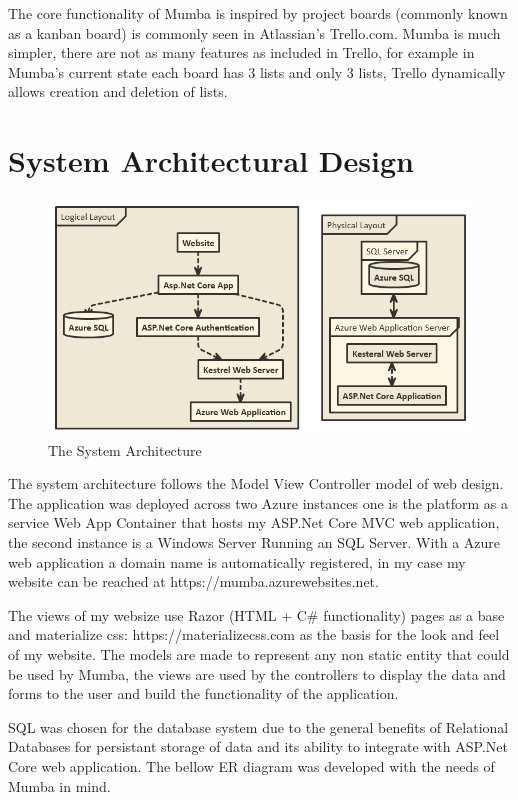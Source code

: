 \documentclass[letterpaper]{article}
\begin{document}
The core functionality of Mumba is inspired by project boards (commonly known as  a kanban board) is commonly seen in Atlassian's Trello.com. Mumba is much simpler, there are not as many features as included in Trello, for example in Mumba's current state each board has 3 lists and only 3 lists, Trello dynamically allows creation and deletion of lists.

\section{System Architectural Design}
\begin{figure}[H]
  \centering
  \caption{The System Architecture}
  \includegraphics[scale=0.45]{Images/System}
\end{figure}
The system architecture follows the Model View Controller model of web design. The application was deployed across two Azure instances one is the platform as a service Web App Container that hosts my ASP.Net Core MVC web application, the second instance is a Windows Server Running an SQL Server. With a Azure web application a domain name is automatically registered, in my case my website can be reached at https://mumba.azurewebsites.net.

The views of my websize use Razor (HTML + C\# functionality) pages as a base and materialize css: https://materializecss.com as the basis for the look and feel of my website. The models are made to represent any non static entity that could be used by Mumba, the views are used by the controllers to display the data and forms to the user and build the functionality of the application.

SQL was chosen for the database system due to the general benefits of Relational Databases for persistant storage of data and its ability to integrate with ASP.Net Core web application. The bellow ER diagram was developed with the needs of Mumba in mind.
\end{document}
